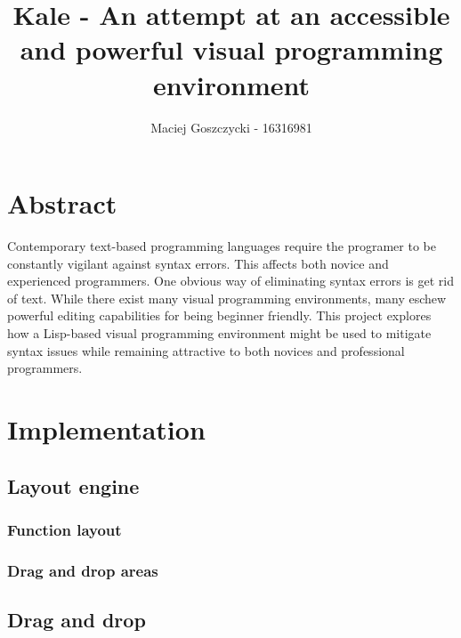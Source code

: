 \documentclass[11pt]{report}
\title{Kale - An attempt at an accessible and powerful visual programming
environment}
\author{Maciej Goszczycki - 16316981}
\date{}
\begin{document}
\maketitle
\newcommand{\ak}[1]{\keys{\arrowkey{#1}}}
\tableofcontents
\clearpage
{}

\begingroup
\let\clearpage\relax
\setcounter{page}{1}

\chapter{Abstract}
Contemporary text-based programming languages require the programer to be
constantly vigilant against syntax errors. This affects both novice and
experienced programmers. One obvious way of eliminating syntax errors is
get rid of text. While there exist many visual programming environments, many
eschew powerful editing capabilities for being beginner friendly.
This project explores how a Lisp-based visual programming environment might be
used to mitigate syntax issues while remaining attractive to both novices and
professional programmers.









\chapter{Implementation}

\section{Layout engine}
\subsection{Function layout}
\subsection{Drag and drop areas}
\section{Drag and drop}
\end{document}
